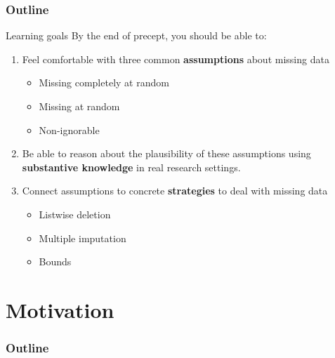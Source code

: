 \documentclass{beamer}
\title{\blue{Precept 8: Missing Data}}
\subtitle{\green{Soc 504: Advanced Social Statistics}}
\author{Ian Lundberg}
\institute[Princeton]{Princeton University}
\date{April 6, 2018}
\newcommand\bgreen[1]{{\color{olive}\textbf{#1}}}
\begin{document}
\frame{\titlepage}

\begin{frame}
\frametitle{Outline}
\tableofcontents
\end{frame}

\begin{frame}{Learning goals}
By the end of precept, you should be able to:
\begin{enumerate}
\item Feel comfortable with three common \bgreen{assumptions} about missing data
\begin{itemize}
\item Missing completely at random
\item Missing at random
\item Non-ignorable
\end{itemize}
\item Be able to reason about the plausibility of these assumptions using \bgreen{substantive knowledge} in real research settings.
\item Connect assumptions to concrete \bgreen{strategies} to deal with missing data
\begin{itemize}
\item Listwise deletion
\item Multiple imputation
\item Bounds
\end{itemize}
\end{enumerate}
\end{frame}

\section{Motivation}

\begin{frame}
\frametitle{Outline}
\tableofcontents[currentsection]
\end{frame}
\end{document}
